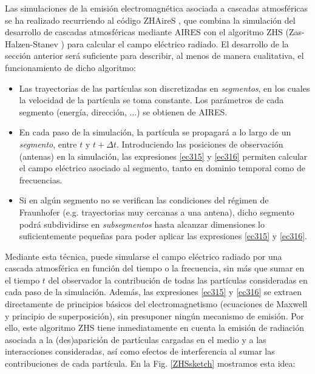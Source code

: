 \documentclass[11 pt, a4paper]{article} %
\numberwithin{equation}{section}
\numberwithin{figure}{section}
\numberwithin{table}{section}
\begin{document}
Las simulaciones de la emisión electromagnética asociada a cascadas atmosféricas se ha realizado recurriendo al código ZHAireS \cite{AlvarezMuniz2012}, que combina la simulación del desarrollo de cascadas atmosféricas mediante AIRES con el algoritmo ZHS (Zas-Halzen-Stanev \cite{Zas1992}) para calcular el campo eléctrico radiado. El desarrollo de la sección anterior será suficiente para describir, al menos de manera cualitativa, el funcionamiento de dicho algoritmo:
	\begin{itemize}
		\item Las trayectorias de las partículas son discretizadas en \textit{segmentos}, en los cuales la velocidad de la partícula se toma constante. Los parámetros de cada segmento (energía, dirección, ...) se obtienen de AIRES.
		\item En cada paso de la simulación, la partícula se propagará a lo largo de un \textit{segmento}, entre $t$ y $t+\Delta t$. Introduciendo las posiciones de observación (antenas) en la simulación, las expresiones \eqref{ec315} y \eqref{ec316} permiten calcular el campo eléctrico asociado al segmento, tanto en dominio temporal como de frecuencias.
		\item Si en algún segmento no se verifican las condiciones del régimen de Fraunhofer (e.g. trayectorias muy cercanas a una antena), dicho segmento podrá subdividirse en \textit{subsegmentos} hasta alcanzar dimensiones lo suficientemente pequeñas para poder aplicar las expresiones \eqref{ec315} y \eqref{ec316}.

		
	\end{itemize}
Mediante esta técnica, puede simularse el campo eléctrico radiado por una cascada atmosférica en función del tiempo o la frecuencia, sin más que sumar en el tiempo $t$ del observador la contribución de todas las partículas consideradas en cada paso de la simulación. Además, las expresiones \eqref{ec315} y \eqref{ec316} se extraen directamente de principios básicos del electromagnetismo (ecuaciones de Maxwell y principio de superposición), sin presuponer ningún mecanismo de emisión. Por ello, este algoritmo ZHS tiene inmediatamente en cuenta la emisión de radiación asociada a la (des)aparición de partículas cargadas en el medio y a las interacciones consideradas, así como efectos de interferencia al sumar las contribuciones de cada partícula. En la Fig. \ref{ZHSsketch} mostramos esta idea:  
\end{document}
